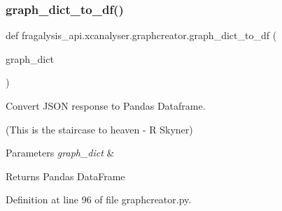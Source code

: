 \subsubsection{\texorpdfstring{graph\+\_\+dict\+\_\+to\+\_\+df()}{graph\_dict\_to\_df()}}
{\footnotesize\ttfamily def fragalysis\+\_\+api.\+xcanalyser.\+graphcreator.\+graph\+\_\+dict\+\_\+to\+\_\+df (\begin{DoxyParamCaption}\item[{}]{graph\+\_\+dict }\end{DoxyParamCaption})}



Convert J\+S\+ON response to Pandas Dataframe. 

(This is the staircase to heaven -\/ R Skyner)


\begin{DoxyParams}{Parameters}
{\em graph\+\_\+dict} & \\
\hline
\end{DoxyParams}
\begin{DoxyReturn}{Returns}
Pandas Data\+Frame 
\end{DoxyReturn}


Definition at line 96 of file graphcreator.\+py.


